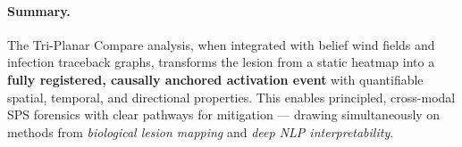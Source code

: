 \documentclass[11pt]{article}
\begin{document}
\paragraph{Summary.}
The Tri-Planar Compare analysis, when integrated with belief wind fields and infection traceback graphs, transforms the lesion from a static heatmap into a \textbf{fully registered, causally anchored activation event} with quantifiable spatial, temporal, and directional properties.  
This enables principled, cross-modal SPS forensics with clear pathways for mitigation — drawing simultaneously on methods from \emph{biological lesion mapping} and \emph{deep NLP interpretability}.
\end{document}
